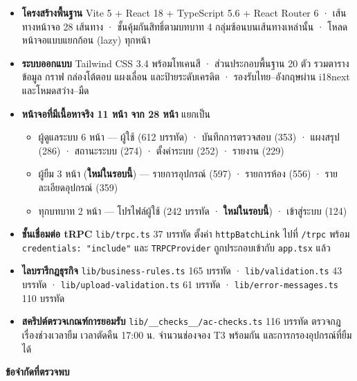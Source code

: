 \begin{itemize}
  \item \textbf{โครงสร้างพื้นฐาน} Vite 5 + React 18 + TypeScript 5.6 + React Router 6 · เส้นทางหน้าจอ 28 เส้นทาง · ชั้นคุ้มกันสิทธิ์ตามบทบาท 4 กลุ่มซ้อนบนเส้นทางเหล่านั้น · โหลดหน้าจอแบบแยกก้อน (lazy) ทุกหน้า
  \item \textbf{ระบบออกแบบ} Tailwind CSS 3.4 พร้อมโทเคนสี · ส่วนประกอบพื้นฐาน 20 ตัว รวมตารางข้อมูล กราฟ กล่องโต้ตอบ แผงเลื่อน และป้ายระดับเครดิต · รองรับไทย–อังกฤษผ่าน i18next และโหมดสว่าง–มืด
  \item \textbf{หน้าจอที่มีเนื้อหาจริง 11 หน้า จาก 28 หน้า} แยกเป็น
    \begin{itemize}
      \item ผู้ดูแลระบบ 6 หน้า — ผู้ใช้ (612 บรรทัด) · บันทึกการตรวจสอบ (353) · แผงสรุป (286) · สถานะระบบ (274) · ตั้งค่าระบบ (252) · รายงาน (229)
      \item ผู้ยืม 3 หน้า (\textbf{ใหม่ในรอบนี้}) — รายการอุปกรณ์ (597) · รายการห้อง (556) · รายละเอียดอุปกรณ์ (359)
      \item ทุกบทบาท 2 หน้า — โปรไฟล์ผู้ใช้ (242 บรรทัด · \textbf{ใหม่ในรอบนี้}) · เข้าสู่ระบบ (124)
    \end{itemize}
  \item \textbf{ชั้นเชื่อมต่อ tRPC} \texttt{lib/trpc.ts} 37 บรรทัด ตั้งค่า \texttt{httpBatchLink} ไปที่ \texttt{/trpc} พร้อม \texttt{credentials: "include"} และ \texttt{TRPCProvider} ถูกประกอบเข้ากับ \texttt{app.tsx} แล้ว
  \item \textbf{ไลบรารีกฎธุรกิจ} \texttt{lib/business-rules.ts} 165 บรรทัด · \texttt{lib/validation.ts} 43 บรรทัด · \texttt{lib/upload-validation.ts} 61 บรรทัด · \texttt{lib/error-messages.ts} 110 บรรทัด
  \item \textbf{สคริปต์ตรวจเกณฑ์การยอมรับ} \texttt{lib/\_\_checks\_\_/ac-checks.ts} 116 บรรทัด ตรวจกฎเรื่องช่วงเวลายืม เวลาตัดคืน 17:00 น. จำนวนช่องจอง T3 พร้อมกัน และการกรองอุปกรณ์ที่ยืมได้
\end{itemize}

\noindent\textbf{ข้อจำกัดที่ตรวจพบ}

